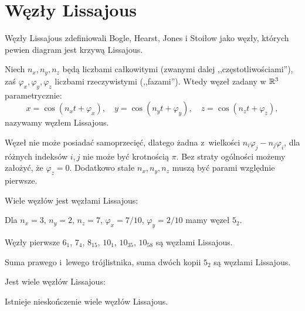 
\section{Węzły Lissajous}
%
Węzły Lissajous zdefiniowali Bogle, Hearst, Jones i Stoiłow \cite{bogle1994} jako węzły, których pewien diagram jest krzywą Lissajous.
%
%
%
%

\begin{definition}
    Niech $n_x, n_y, n_z$ będą liczbami całkowitymi (zwanymi dalej ,,częstotliwościami''), zaś  $\varphi_x, \varphi_y, \varphi_z$ liczbami rzeczywistymi (,,fazami'').
    Wtedy węzeł zadany w $\mathbb R^3$ parametrycznie:
    \begin{equation}
        x = \cos(n_xt + \varphi_x), \quad
        y = \cos(n_yt + \varphi_y), \quad
        z = \cos(n_zt + \varphi_z),
    \end{equation}
    nazywamy węzłem Lissajous.
\end{definition}

Węzeł nie może posiadać samoprzecięć, dlatego żadna z~wielkości $n_i\varphi_j-n_j\varphi_i$, dla różnych indeksów $i, j$ nie może być krotnością $\pi$.
Bez straty ogólności możemy założyć, że $\varphi_z = 0$.
Dodatkowo stałe $n_x, n_y, n_z$ muszą być parami względnie pierwsze.

Wiele węzłów jest węzłami Lissajous:

\begin{example}
    Dla $n_x = 3$, $n_y = 2$, $n_z = 7$, $\varphi_x = 7/10$, $\varphi_y = 2/10$ mamy węzeł $5_2$.
\end{example}

\begin{example}
    Węzły pierwsze $6_1$, $7_4$, $8_{15}$, $10_1$, $10_{35}$, $10_{58}$ są węzłami Lissajous.
\end{example}

\begin{example}
    Suma prawego i~lewego trójlistnika, suma dwóch kopii $5_2$ są węzłami Lissajous.
\end{example}

Jest wiele węzłów Lissajous:

\begin{proposition}
    Istnieje nieskończenie wiele węzłów Lissajous.
\end{proposition}

